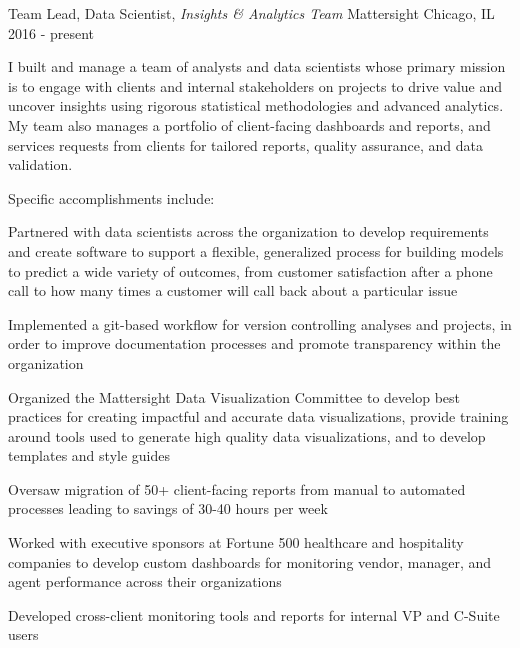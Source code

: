 

\begin{cventries}

  \cventry
    {Team Lead, Data Scientist, \textit{Insights \& Analytics Team}} %
    {Mattersight} %
    {Chicago, IL} %
    {2016 - present} %
    {
      \begin{cvitems} %
      I built and manage a team of analysts and data scientists whose primary mission is to engage with clients and internal stakeholders on projects to drive value and uncover insights using rigorous statistical methodologies and advanced analytics. My team also manages a portfolio of client-facing dashboards and reports, and services requests from clients for tailored reports, quality assurance, and data validation.
      \item {Specific accomplishments include:}
        \item {Partnered with data scientists across the organization to develop requirements and create software to support a flexible, generalized process for building models to predict a wide variety of outcomes, from customer satisfaction after a phone call to how many times a customer will call back about a particular issue}
        \item {Implemented a git-based workflow for version controlling analyses and projects, in order to improve documentation processes and promote transparency within the organization}
        \item {Organized the Mattersight Data Visualization Committee to develop best practices for creating impactful and accurate data visualizations, provide training around tools used to generate high quality data visualizations, and to develop templates and style guides}
        \item {Oversaw migration of 50+ client-facing reports from manual to automated processes leading to savings of 30-40 hours per week}
        \item{Worked with executive sponsors at Fortune 500 healthcare and hospitality companies to develop custom dashboards for monitoring vendor, manager, and agent performance across their organizations}
        \item{Developed cross-client monitoring tools and reports for internal VP and C-Suite users}
      \end{cvitems}
    }


\end{cventries}
